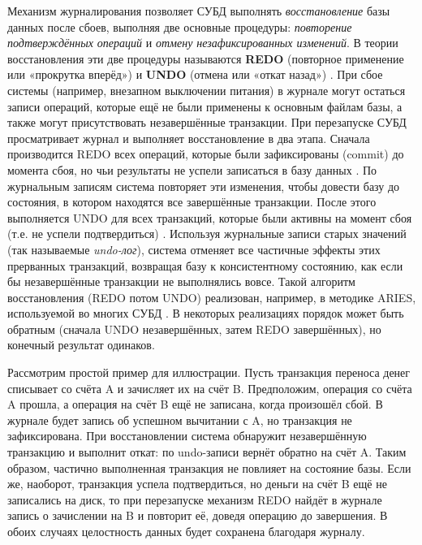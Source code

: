  Механизм журналирования позволяет СУБД выполнять \textit{восстановление} базы данных после сбоев, выполняя две основные процедуры: \textit{повторение подтверждённых операций} и \textit{отмену незафиксированных изменений}. В теории восстановления эти две процедуры называются \textbf{REDO} (повторное применение или «прокрутка вперёд») и \textbf{UNDO} (отмена или «откат назад») \autocite{ElmasriNavathe}. При сбое системы (например, внезапном выключении питания) в журнале могут остаться записи операций, которые ещё не были применены к основным файлам базы, а также могут присутствовать незавершённые транзакции. При перезапуске СУБД просматривает журнал и выполняет восстановление в два этапа. Сначала производится REDO всех операций, которые были зафиксированы (commit) до момента сбоя, но чьи результаты не успели записаться в базу данных \autocite{ElmasriNavathe}. По журнальным записям система повторяет эти изменения, чтобы довести базу до состояния, в котором находятся все завершённые транзакции. После этого выполняется UNDO для всех транзакций, которые были активны на момент сбоя (т.е. не успели подтвердиться) \autocite{ElmasriNavathe}. Используя журнальные записи старых значений (так называемые \textit{undo-лог}), система отменяет все частичные эффекты этих прерванных транзакций, возвращая базу к консистентному состоянию, как если бы незавершённые транзакции не выполнялись вовсе. Такой алгоритм восстановления (REDO потом UNDO) реализован, например, в методике ARIES, используемой во многих СУБД \autocite{Silberschatz}. В некоторых реализациях порядок может быть обратным (сначала UNDO незавершённых, затем REDO завершённых), но конечный результат одинаков. 
 
 Рассмотрим простой пример для иллюстрации. Пусть транзакция переноса денег списывает  со счёта A и зачисляет их на счёт B. Предположим, операция со счёта A прошла, а операция на счёт B ещё не записана, когда произошёл сбой. В журнале будет запись об успешном вычитании  с A, но транзакция не зафиксирована. При восстановлении система обнаружит незавершённую транзакцию и выполнит откат: по undo-записи вернёт  обратно на счёт A. Таким образом, частично выполненная транзакция не повлияет на состояние базы. Если же, наоборот, транзакция успела подтвердиться, но деньги на счёт B ещё не записались на диск, то при перезапуске механизм REDO найдёт в журнале запись о зачислении  на B и повторит её, доведя операцию до завершения. В обоих случаях целостность данных будет сохранена благодаря журналу. 
 
